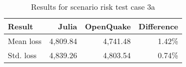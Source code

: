 \begin{table}[h]

\centering
\begin{tabular}{ l r r r }

\hline
\rowcolor{anti-flashwhite}
\bf{Result} & \bf{Julia} & \bf{OpenQuake} & \bf{Difference}\\
\hline
Mean loss & 4,809.84 & 4,741.48 & 1.42\% \\
Std. loss & 4,839.26 & 4,803.54 & 0.74\% \\
\hline
\end{tabular}

\caption{Results for scenario risk test case 3a}
\label{tab:result-sr-3a}
\end{table}